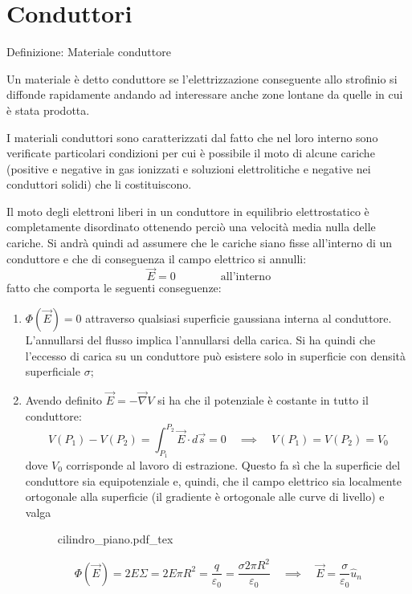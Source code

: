 \documentclass[x11names]{report}
\newcommand{\definizione}[2]{
	\begin{center}
		\fboxsep11pt
		\colorbox{myblue}{\begin{minipage}{5.75in}
				\begin{blues}{Definizione: #1}
					#2
				\end{blues}
		\end{minipage}}
	\end{center}
}
\newcommand{\incfig}[1]{%
	{#1.pdf_tex}
}
\begin{document}
\newpage
\section{Conduttori}
\definizione{Materiale conduttore}{
	Un materiale è detto conduttore se l'elettrizzazione conseguente allo strofinio si diffonde rapidamente andando ad interessare anche zone lontane da quelle in cui è stata prodotta. 
}
I materiali conduttori sono caratterizzati dal fatto che nel loro interno sono verificate particolari condizioni per cui è possibile il moto di alcune cariche (positive e negative in gas ionizzati e soluzioni elettrolitiche e negative nei conduttori solidi) che li costituiscono.

Il moto degli elettroni liberi in un conduttore in equilibrio elettrostatico è completamente disordinato ottenendo perciò una velocità media nulla delle cariche. Si andrà quindi ad assumere che le cariche siano fisse all'interno di un conduttore e che di conseguenza il campo elettrico si annulli:
\[
\vec{E} = 0 \qquad\qquad \text{all'interno}
\]
fatto che comporta le seguenti conseguenze:
\begin{enumerate}
	\item \(\Phi(\vec{E}) = 0\) attraverso qualsiasi superficie gaussiana interna al conduttore. L'annullarsi del flusso implica l'annullarsi della carica. Si ha quindi che l'eccesso di carica su un conduttore può esistere solo in superficie con densità superficiale \(\sigma\);
	\item Avendo definito \(\vec{E} = - \vec{\nabla}V\) si ha che il potenziale è costante in tutto il conduttore:
	\[
	V(P_1) - V(P_2) = \int_{P_1}^{P_2}\vec{E} \cdot d\vec{s} = 0 \quad \implies \quad V(P_1) = V(P_2) = V_0
	\]
	dove \(V_0\) corrisponde al lavoro di estrazione.
	Questo fa sì che la superficie del conduttore sia equipotenziale e, quindi, che il campo elettrico sia localmente ortogonale alla superficie (il gradiente è ortogonale alle curve di livello) e valga
	
	\begin{figure}[H]
		\centering
		\incfig{cilindro_piano}
	\end{figure}
	\[
	\Phi(\vec{E}) = 2 E\Sigma = 2 E\pi R^2 = \frac{q}{\varepsilon_0} = \frac{\sigma 2\pi R^2}{\varepsilon_0} \quad \implies \quad \vec{E} = \frac{\sigma}{\varepsilon_0}\hat{u}_n
	\]
\end{enumerate}
\end{document}
